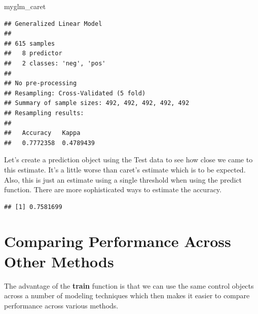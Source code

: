 \documentclass[]{book}
\newenvironment{Shaded}{\begin{snugshade}}{\end{snugshade}}
\newcommand{\KeywordTok}[1]{\textcolor[rgb]{0.13,0.29,0.53}{\textbf{#1}}}
\newcommand{\DataTypeTok}[1]{\textcolor[rgb]{0.13,0.29,0.53}{#1}}
\newcommand{\StringTok}[1]{\textcolor[rgb]{0.31,0.60,0.02}{#1}}
\newcommand{\CommentTok}[1]{\textcolor[rgb]{0.56,0.35,0.01}{\textit{#1}}}
\newcommand{\OperatorTok}[1]{\textcolor[rgb]{0.81,0.36,0.00}{\textbf{#1}}}
\newcommand{\NormalTok}[1]{#1}
\begin{document}
\begin{Shaded}
\begin{Highlighting}[]
\NormalTok{myglm_caret}
\end{Highlighting}
\end{Shaded}

\begin{verbatim}
## Generalized Linear Model 
## 
## 615 samples
##   8 predictor
##   2 classes: 'neg', 'pos' 
## 
## No pre-processing
## Resampling: Cross-Validated (5 fold) 
## Summary of sample sizes: 492, 492, 492, 492, 492 
## Resampling results:
## 
##   Accuracy   Kappa    
##   0.7772358  0.4789439
\end{verbatim}

Let's create a prediction object using the Test data to see how close we
came to this estimate. It's a little worse than caret's estimate which
is to be expected. Also, this is just an estimate using a single
threshold when using the predict function. There are more sophisticated
ways to estimate the accuracy.

\begin{Shaded}
\end{Shaded}

\begin{verbatim}
## [1] 0.7581699
\end{verbatim}

\section{Comparing Performance Across Other
Methods}\label{comparing-performance-across-other-methods}

The advantage of the \textbf{train} function is that we can use the same
control objects across a number of modeling techniques which then makes
it easier to compare performance across various methods.
\end{document}

